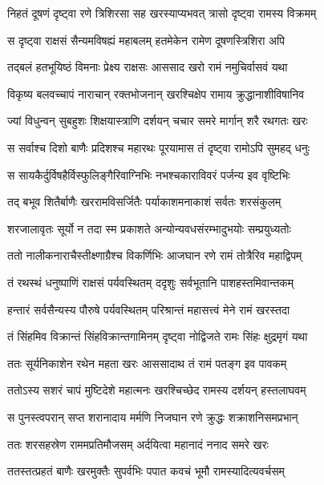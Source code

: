 
\twolineshloka
{निहतं दूषणं दृष्ट्वा रणे त्रिशिरसा सह}
{खरस्याप्यभवत् त्रासो दृष्ट्वा रामस्य विक्रमम्} %

\twolineshloka
{स दृष्ट्वा राक्षसं सैन्यमविषह्यं महाबलम्}
{हतमेकेन रामेण दूषणस्त्रिशिरा अपि} %

\twolineshloka
{तद्बलं हतभूयिष्ठं विमनाः प्रेक्ष्य राक्षसः}
{आससाद खरो रामं नमुचिर्वासवं यथा} %

\twolineshloka
{विकृष्य बलवच्चापं नाराचान् रक्तभोजनान्}
{खरश्चिक्षेप रामाय क्रुद्धानाशीविषानिव} %

\twolineshloka
{ज्यां विधुन्वन् सुबहुशः शिक्षयास्त्राणि दर्शयन्}
{चचार समरे मार्गान् शरै रथगतः खरः} %

\twolineshloka
{स सर्वाश्च दिशो बाणैः प्रदिशश्च महारथः}
{पूरयामास तं दृष्ट्वा रामोऽपि सुमहद् धनुः} %

\twolineshloka
{स सायकैर्दुर्विषहैर्विस्फुलिङ्गैरिवाग्निभिः}
{नभश्चकाराविवरं पर्जन्य इव वृष्टिभिः} %

\twolineshloka
{तद् बभूव शितैर्बाणैः खररामविसर्जितैः}
{पर्याकाशमनाकाशं सर्वतः शरसंकुलम्} %

\twolineshloka
{शरजालावृतः सूर्यो न तदा स्म प्रकाशते}
{अन्योन्यवधसंरम्भादुभयोः सम्प्रयुध्यतोः} %

\twolineshloka
{ततो नालीकनाराचैस्तीक्ष्णाग्रैश्च विकर्णिभिः}
{आजघान रणे रामं तोत्रैरिव महाद्विपम्} %

\twolineshloka
{तं रथस्थं धनुष्पाणिं राक्षसं पर्यवस्थितम्}
{ददृशुः सर्वभूतानि पाशहस्तमिवान्तकम्} %

\twolineshloka
{हन्तारं सर्वसैन्यस्य पौरुषे पर्यवस्थितम्}
{परिश्रान्तं महासत्त्वं मेने रामं खरस्तदा} %

\twolineshloka
{तं सिंहमिव विक्रान्तं सिंहविक्रान्तगामिनम्}
{दृष्ट्वा नोद्विजते रामः सिंहः क्षुद्रमृगं यथा} %

\twolineshloka
{ततः सूर्यनिकाशेन रथेन महता खरः}
{आससादाथ तं रामं पतङ्ग इव पावकम्} %

\twolineshloka
{ततोऽस्य सशरं चापं मुष्टिदेशे महात्मनः}
{खरश्चिच्छेद रामस्य दर्शयन् हस्तलाघवम्} %

\twolineshloka
{स पुनस्त्वपरान् सप्त शरानादाय मर्मणि}
{निजघान रणे क्रुद्धः शक्राशनिसमप्रभान्} %

\twolineshloka
{ततः शरसहस्रेण राममप्रतिमौजसम्}
{अर्दयित्वा महानादं ननाद समरे खरः} %

\twolineshloka
{ततस्तत्प्रहतं बाणैः खरमुक्तैः सुपर्वभिः}
{पपात कवचं भूमौ रामस्यादित्यवर्चसम्} %

